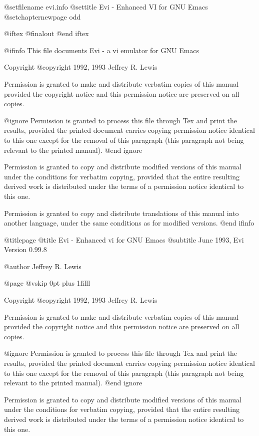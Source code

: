 


@setfilename evi.info
@settitle Evi - Enhanced VI for GNU Emacs
@setchapternewpage odd

@iftex
@finalout
@end iftex

@ifinfo
This file documents Evi - a vi emulator for GNU Emacs

Copyright @copyright{} 1992, 1993  Jeffrey R. Lewis

Permission is granted to make and distribute verbatim copies of
this manual provided the copyright notice and this permission notice
are preserved on all copies.

@ignore
Permission is granted to process this file through Tex and print the
results, provided the printed document carries copying permission
notice identical to this one except for the removal of this paragraph
(this paragraph not being relevant to the printed manual).
@end ignore

Permission is granted to copy and distribute modified versions of this
manual under the conditions for verbatim copying, provided that the entire
resulting derived work is distributed under the terms of a permission
notice identical to this one.

Permission is granted to copy and distribute translations of this manual
into another language, under the same conditions as for modified versions.
@end ifinfo

@titlepage
@title Evi - Enhanced vi for GNU Emacs
@subtitle June 1993, Evi Version 0.99.8

@author Jeffrey R. Lewis

@page
@vskip 0pt plus 1filll

Copyright @copyright{} 1992, 1993  Jeffrey R. Lewis

Permission is granted to make and distribute verbatim copies of
this manual provided the copyright notice and this permission notice
are preserved on all copies.

@ignore
Permission is granted to process this file through Tex and print the
results, provided the printed document carries copying permission
notice identical to this one except for the removal of this paragraph
(this paragraph not being relevant to the printed manual).
@end ignore

Permission is granted to copy and distribute modified versions of this
manual under the conditions for verbatim copying, provided that the entire
resulting derived work is distributed under the terms of a permission
notice identical to this one.

